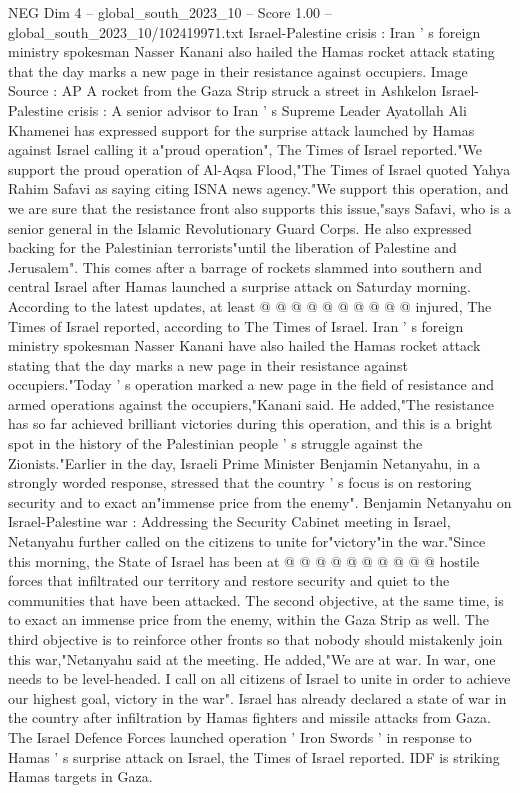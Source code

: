 \begin{textsample}{NEG Dim 4 – global\_south\_2023\_10 – Score 1.00 – global\_south\_2023\_10/102419971.txt}  \label{ex:f4_neg_038}
Israel-Palestine crisis : Iran ' s foreign ministry spokesman Nasser Kanani also hailed the Hamas rocket attack stating that the day marks a new page in their resistance against occupiers.
Image Source : AP A rocket from the Gaza Strip struck a street in Ashkelon Israel-Palestine crisis : A senior advisor to Iran ' s Supreme Leader Ayatollah Ali Khamenei has expressed support for the surprise attack launched by Hamas against Israel calling it a"proud operation", The Times of Israel reported."We support the proud operation of Al-Aqsa Flood,"The Times of Israel quoted Yahya Rahim Safavi as saying citing ISNA news agency."We support this operation, and we are sure that the resistance front also supports this issue,"says Safavi, who is a senior general in the Islamic Revolutionary Guard Corps.
He also expressed backing for the Palestinian terrorists"until the liberation of Palestine and Jerusalem".
This comes after a barrage of rockets slammed into southern and central Israel after Hamas launched a surprise attack on Saturday morning.
According to the latest updates, at least @ @ @ @ @ @ @ @ @ @ injured, The Times of Israel reported, according to The Times of Israel.
Iran ' s foreign ministry spokesman Nasser Kanani have also hailed the Hamas rocket attack stating that the day marks a new page in their resistance against occupiers."Today ' s operation marked a new page in the field of resistance and armed operations against the occupiers,"Kanani said.
He added,"The resistance has so far achieved brilliant victories during this operation, and this is a bright spot in the history of the Palestinian people ' s struggle against the Zionists."Earlier in the day, Israeli Prime Minister Benjamin Netanyahu, in a strongly worded response, stressed that the country ' s focus is on restoring security and to exact an"immense price from the enemy".
Benjamin Netanyahu on Israel-Palestine war : Addressing the Security Cabinet meeting in Israel, Netanyahu further called on the citizens to unite for"victory"in the war."Since this morning, the State of Israel has been at @ @ @ @ @ @ @ @ @ @ hostile forces that infiltrated our territory and restore security and quiet to the communities that have been attacked.
The second objective, at the same time, is to exact an immense price from the enemy, within the Gaza Strip as well.
The third objective is to reinforce other fronts so that nobody should mistakenly join this war,"Netanyahu said at the meeting.
He added,"We are at war.
In war, one needs to be level-headed.
I call on all citizens of Israel to unite in order to achieve our highest goal, victory in the war".
Israel has already declared a state of war in the country after infiltration by Hamas fighters and missile attacks from Gaza.
The Israel Defence Forces launched operation ' Iron Swords ' in response to Hamas ' s surprise attack on Israel, the Times of Israel reported.
IDF is striking Hamas targets in Gaza.

\end{textsample}
